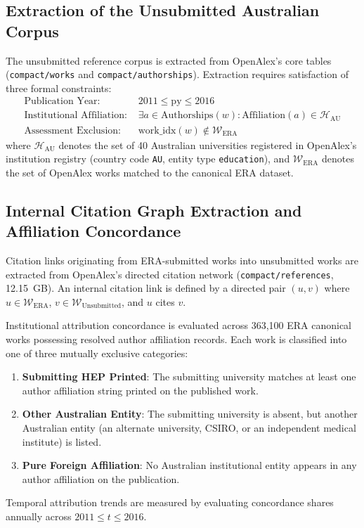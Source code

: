\subsection{Extraction of the Unsubmitted Australian Corpus}
The unsubmitted reference corpus is extracted from OpenAlex's core tables (\texttt{compact/works} and \texttt{compact/authorships}). Extraction requires satisfaction of three formal constraints:
\begin{align}
    \text{Publication Year: } & 2011 \le \text{py} \le 2016 \\
    \text{Institutional Affiliation: } & \exists a \in \text{Authorships}(w) : \text{Affiliation}(a) \in \mathcal{H}_{\text{AU}} \\
    \text{Assessment Exclusion: } & \text{work\_idx}(w) \notin \mathcal{W}_{\text{ERA}}
\end{align}
where $\mathcal{H}_{\text{AU}}$ denotes the set of 40 Australian universities registered in OpenAlex's institution registry (country code \texttt{AU}, entity type \texttt{education}), and $\mathcal{W}_{\text{ERA}}$ denotes the set of OpenAlex works matched to the canonical ERA dataset.

\subsection{Internal Citation Graph Extraction and Affiliation Concordance}
Citation links originating from ERA-submitted works into unsubmitted works are extracted from OpenAlex's directed citation network (\texttt{compact/references}, 12.15~GB). An internal citation link is defined by a directed pair $(u, v)$ where $u \in \mathcal{W}_{\text{ERA}}$, $v \in \mathcal{W}_{\text{Unsubmitted}}$, and $u$ cites $v$.

Institutional attribution concordance is evaluated across 363,100 ERA canonical works possessing resolved author affiliation records. Each work is classified into one of three mutually exclusive categories:
\begin{enumerate}
    \item \textbf{Submitting HEP Printed}: The submitting university matches at least one author affiliation string printed on the published work.
    \item \textbf{Other Australian Entity}: The submitting university is absent, but another Australian entity (an alternate university, CSIRO, or an independent medical institute) is listed.
    \item \textbf{Pure Foreign Affiliation}: No Australian institutional entity appears in any author affiliation on the publication.
\end{enumerate}
Temporal attribution trends are measured by evaluating concordance shares annually across $2011 \le t \le 2016$.

